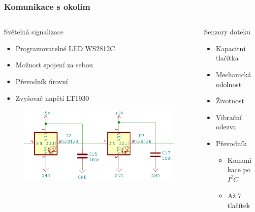 \documentclass[%
  12pt,       				%
	t,                  %
	aspectratio=1610,   %
	unicode,						%
]{beamer}				    	%
\begin{document}
\begin{frame} 
	\frametitle{Komunikace s okolím}
	
	\begin{columns}[T] 								%
		\begin{column}{0.5\textwidth}		%
			Světelná signalizace
			\begin{itemize}
				\item Programovatelné LED WS2812C
				\item Možnost spojení za sebou
				\item Převodník úrovní
				\item Zvyšovač napětí LT1930
			\end{itemize}
			\begin{figure}%
				\centering	          
				\includegraphics[width=1\columnwidth]{obrazky/WS2812C_prezentace.png}
			\end{figure}
		\end{column}
		\begin{column}{0.5\textwidth}		%
			Senzory doteku
			\begin{itemize}
				\item Kapacitní tlačítka
				\item Mechanická odolnost
				\item Životnost
				\item Vibrační odezva
				\item Převodník
				\begin{itemize}
					\item Komunikace po $I^2C$
					\item Až 7 tlačítek
				\end{itemize}
			\end{itemize}
		\end{column}
	\end{columns}											%
\end{frame}
\end{document}
